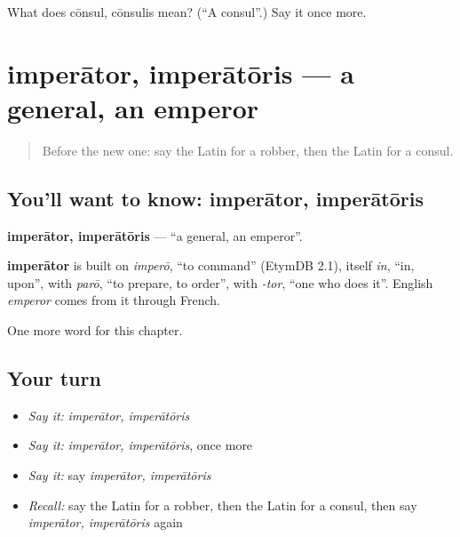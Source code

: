 \begin{tcolorbox}[breakable,colback=teal!4,colframe=teal!35!black,title={Before you move on}]
What does cōnsul, cōnsulis mean? (\textquotedblleft{}A consul\textquotedblright{}.) Say it once more.
\end{tcolorbox}
\section[imperātor, imperātōris]{imperātor, imperātōris — a general, an emperor}

\label{lesson:LA-C245-imperator}



\begin{quote}
Before the new one: say the Latin for a robber, then the Latin for a consul.
\end{quote}

\subsection*{You'll want to know: imperātor, imperātōris}
\textbf{imperātor, imperātōris} — \textquotedblleft{}a general, an emperor\textquotedblright{}.

\begin{cousinweb}
\textbf{imperātor} is built on \emph{imperō}, \textquotedblleft{}to command\textquotedblright{} (EtymDB 2.1), itself \emph{in}, \textquotedblleft{}in, upon\textquotedblright{}, with \emph{parō}, \textquotedblleft{}to prepare, to order\textquotedblright{}, with \emph{-tor}, \textquotedblleft{}one who does it\textquotedblright{}. English \emph{emperor} comes from it through French.
\end{cousinweb}

\begin{grammarlens}[title={What you've built}]
One more word for this chapter.
\end{grammarlens}

\subsection*{Your turn}
\begin{itemize}
\raggedright
  \item \emph{Say it:} \emph{imperātor, imperātōris}
  \item \emph{Say it:} \emph{imperātor, imperātōris}, once more
  \item \emph{Say it:} say \emph{imperātor, imperātōris}
  \item \emph{Recall:} say the Latin for a robber, then the Latin for a consul, then say \emph{imperātor, imperātōris} again
\end{itemize}

